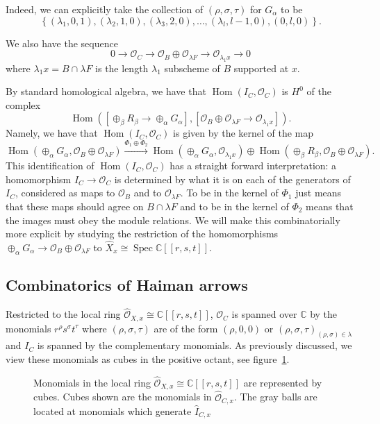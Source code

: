 \documentclass{amsart}
\theoremstyle{definition}
\newcommand{\CC} {\mathbb{C}}          %
\renewcommand{\O}{\mathcal{O}}
\newcommand{\Hom}{\operatorname{Hom}}
\newcommand{\Spec}{\operatorname{Spec}}
\renewcommand{\hat}{\widehat}
\begin{document}
Indeed, we can explicitly take the collection of $(\rho ,\sigma
,\tau)$ for $G_{\alpha}$ to be 
\[
\left\{(\lambda_{1},0,1),(\lambda_{2},1,0),(\lambda_{3},2,0),\dotsc
,(\lambda_{l},l-1,0),(0,l,0) \right\}.
\]

We also have the sequence
\[
0\to \O_{C} \to \O_{B}\oplus\O_{\lambda F}\to \O_{\lambda_{1}x}\to 0
\]
where $\lambda_{1}x=B\cap \lambda F$ is the length $\lambda_{1}$
subscheme of $B$ supported at $x$.

By standard homological algebra, we have that $\Hom (I_{C},\O_{C})$ is
$H^{0}$ of the complex
\[
\Hom \left(\left[\oplus_{\beta}R_{\beta}\to
\oplus_{\alpha}G_{\alpha} \right],[\O_{B}\oplus \O_{\lambda F}\to
\O_{\lambda_{1}x}] \right).
\]
Namely, we have that $\Hom (I_{C},\O_{C})$ is given by the kernel of
the map
\[
\Hom (\oplus_{\alpha}G_{\alpha},\O_{B}\oplus \O_{\lambda
F}) \xrightarrow{\Phi_{1}\oplus \Phi_{2}}
\Hom(\oplus_{\alpha}G_{\alpha},\O_{\lambda_{1}x})\oplus \Hom
(\oplus_{\beta}R_{\beta},\O_{B}\oplus \O_{\lambda F}).
\]
This identification of $\Hom (I_{C},\O_{C})$ has a straight forward
interpretation: a homomorphism $I_{C}\to \O_C$ is determined by what
it is on each of the generators of $I_{C}$, considered as maps to
$\O_{B}$ and to $\O_{\lambda F}$. To be in the kernel of $\Phi_{1}$
just means that these maps should agree on $B\cap \lambda F$ and to be
in the kernel of $\Phi_{2}$ means that the images must obey the module
relations. We will make this combinatorially more explicit by studying
the restriction of the homomorphisms $\oplus_{\alpha}G_{\alpha}\to
\O_{B}\oplus \O_{\lambda F}$ to $\widehat{X}_{x}\cong \Spec \CC
[[r,s,t]]$.

\subsection{Combinatorics of Haiman arrows}

Restricted to the local ring $\widehat{\O}_{X,x} \cong \CC [[r,s,t]]$,
$\O_{C}$ is spanned over $\CC$ by the monomials
$r^{\rho}s^{\sigma}t^{\tau}$ where $(\rho ,\sigma ,\tau )$ are of the
form $(\rho ,0,0)$ or $(\rho ,\sigma ,\tau )_{(\rho ,\sigma )\in
\lambda}$ and $I_{C}$ is spanned by the complementary monomials. As
previously discussed, we view these monomials as cubes in the positive
octant, see figure~\ref{fig: B union lambda F cubes}.


\begin{figure}

\caption{Monomials in the local ring
$\widehat{\O}_{X,x} \cong \CC [[r,s,t]]$ are represented by
cubes. Cubes shown are the monomials in
$\widehat{\O}_{C,x}$. The gray balls are located at monomials which
generate $\hat{I}_{C,x}$ }\label{fig: B union lambda F cubes}
\end{figure}
\end{document}
